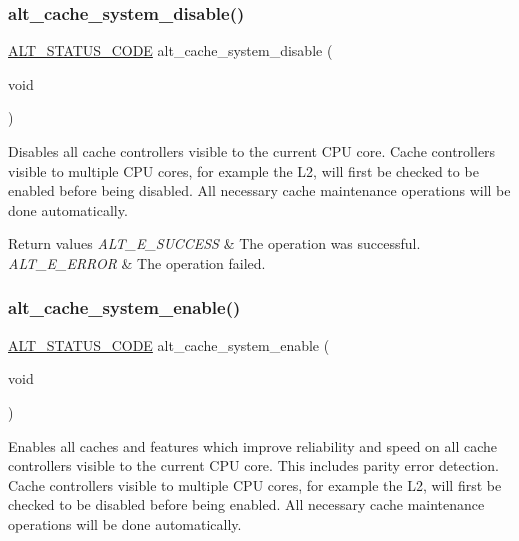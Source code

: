 \subsubsection{\texorpdfstring{alt\_cache\_system\_disable()}{alt\_cache\_system\_disable()}}
{\footnotesize\ttfamily \mbox{\hyperlink{hwlib_8h_abdb0d369f069723ca55d6c94bcaaaa12}{A\+L\+T\+\_\+\+S\+T\+A\+T\+U\+S\+\_\+\+C\+O\+DE}} alt\+\_\+cache\+\_\+system\+\_\+disable (\begin{DoxyParamCaption}\item[{void}]{ }\end{DoxyParamCaption})}

Disables all cache controllers visible to the current C\+PU core. Cache controllers visible to multiple C\+PU cores, for example the L2, will first be checked to be enabled before being disabled. All necessary cache maintenance operations will be done automatically.


\begin{DoxyRetVals}{Return values}
{\em A\+L\+T\+\_\+\+E\+\_\+\+S\+U\+C\+C\+E\+SS} & The operation was successful. \\
\hline
{\em A\+L\+T\+\_\+\+E\+\_\+\+E\+R\+R\+OR} & The operation failed. \\
\hline
\end{DoxyRetVals}
\mbox{\label{group__CACHE__SYS_ga7e2d77afe993421ee6f3ba6a6bc419ee}} 
\subsubsection{\texorpdfstring{alt\_cache\_system\_enable()}{alt\_cache\_system\_enable()}}
{\footnotesize\ttfamily \mbox{\hyperlink{hwlib_8h_abdb0d369f069723ca55d6c94bcaaaa12}{A\+L\+T\+\_\+\+S\+T\+A\+T\+U\+S\+\_\+\+C\+O\+DE}} alt\+\_\+cache\+\_\+system\+\_\+enable (\begin{DoxyParamCaption}\item[{void}]{ }\end{DoxyParamCaption})}

Enables all caches and features which improve reliability and speed on all cache controllers visible to the current C\+PU core. This includes parity error detection. Cache controllers visible to multiple C\+PU cores, for example the L2, will first be checked to be disabled before being enabled. All necessary cache maintenance operations will be done automatically.



